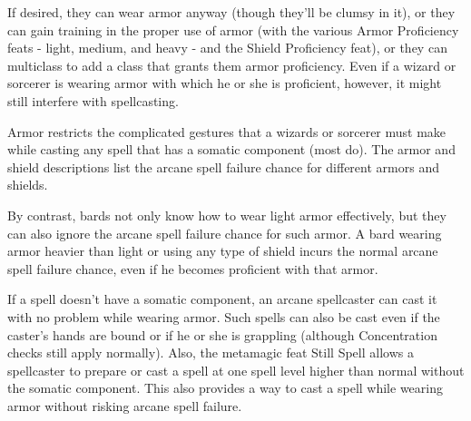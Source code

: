 \smallskip\noindent If desired, they can wear armor anyway (though they'll be clumsy in it), or they can gain training in the proper use of armor (with the various Armor Proficiency feats - light, medium, and heavy - and the Shield Proficiency feat), or they can multiclass to add a class that grants them armor proficiency. Even if a wizard or sorcerer is wearing armor with which he or she is proficient, however, it might still interfere with spellcasting.

\smallskip\noindent Armor restricts the complicated gestures that a wizards or sorcerer must make while casting any spell that has a somatic component (most do). The armor and shield descriptions list the arcane spell failure chance for different armors and shields.

\smallskip\noindent By contrast, bards not only know how to wear light armor effectively, but they can also ignore the arcane spell failure chance for such armor. A bard wearing armor heavier than light or using any type of shield incurs the normal arcane spell failure chance, even if he becomes proficient with that armor.

\smallskip\noindent If a spell doesn't have a somatic component, an arcane spellcaster can cast it with no problem while wearing armor. Such spells can also be cast even if the caster's hands are bound or if he or she is grappling (although Concentration checks still apply normally). Also, the metamagic feat Still Spell allows a spellcaster to prepare or cast a spell at one spell level higher than normal without the somatic component. This also provides a way to cast a spell while wearing armor without risking arcane spell failure.